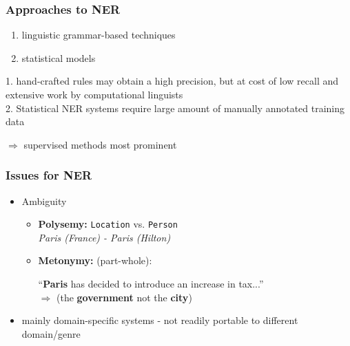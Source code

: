 \documentclass[10pt]{beamer}
\begin{document}
 


\begin{frame}
\frametitle{Approaches to NER}

\begin{enumerate}
 \item linguistic grammar-based techniques
 \item statistical models
\end{enumerate}

1. hand-crafted rules may obtain a high precision, but at cost of low recall
and extensive work by computational linguists\\

2. Statistical NER systems require large amount of manually annotated training data

$\Rightarrow$ supervised methods most prominent


\end{frame}


\begin{frame}
\frametitle{Issues for NER}


\begin{itemize}
 \item Ambiguity


\begin{itemize}
 \item \textbf{Polysemy:} \texttt{Location} vs. \texttt{Person} \\
 
 \emph{Paris (France) - Paris (Hilton)}\\
 
 \item \textbf{Metonymy:}  (part-whole):
 
 ``\textbf{Paris} has decided to introduce an increase in tax...'' \\
 
 $\Rightarrow$ (the \textbf{government} not the \textbf{city})  
\end{itemize}

 \item mainly domain-specific systems - not readily portable to different domain/genre %
 
\end{itemize}

\end{frame}
\end{document}
